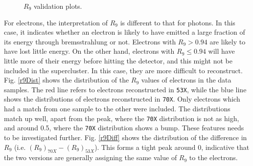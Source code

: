 \documentclass[10pt]{article}
\begin{document}
\begin{figure}[h!]
        \caption{$R_9$ validation plots.}\label{r9Validation}
\end{figure}

For electrons, the interpretation of $R_9$ is different to that for photons. In this case, it indicates whether an electron is likely to have emitted a large fraction of its energy through bremsstrahlung or not. Electrons with $R_9>0.94$ are likely to have lost little energy. On the other hand, electrons with $R_9\leq 0.94$ will have little more of their energy before hitting the detector, and this might not be included in the supercluster. In this case, they are more difficult to reconstruct. Fig. \ref{r9Dist} shows the distribution of the $R_9$ values of electrons in the data samples. The red line refers to electrons reconstructed in \texttt{53X}, while the blue line shows the distributions of electrons reconstructed in \texttt{70X}. Only electrons which had a match from one sample to the other were included. The distributions match up well, apart from the peak, where the \texttt{70X} distribution is not as high, and around 0.5, where the \texttt{70X} distribution shows a bump. These features needs to be investigated further. Fig. \ref{r9Diff} shows the distribution of the difference in $R_9$ (i.e. $(R_9)_{70X} -(R_9)_{53X}$). This forms a tight peak around 0, indicative that the two versions are generally assigning the same value of $R_9$ to the electrons.
\end{document}
